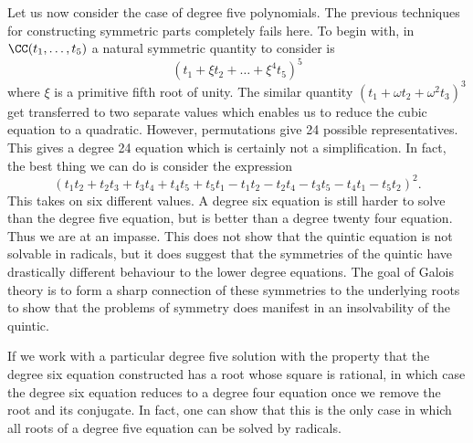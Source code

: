Let us now consider the case of degree five polynomials. The previous techniques for constructing symmetric parts completely fails here. To begin with, in $\CC(t_1,\dots,t_5)$ a natural symmetric quantity to consider is
%
\[ (t_1 + \xi t_2 + \dots + \xi^4 t_5)^5 \]
%
where $\xi$ is a primitive fifth root of unity. The similar quantity $(t_1 + \omega t_2 + \omega^2 t_3)^3$ get transferred to two separate values which enables us to reduce the cubic equation to a quadratic. However, permutations give 24 possible representatives. This gives a degree 24 equation which is certainly not a simplification. In fact, the best thing we can do is consider the expression
%
\[ (t_1t_2 + t_2t_3 + t_3t_4 + t_4t_5 + t_5t_1 - t_1t_2 - t_2t_4 - t_3t_5 - t_4t_1 - t_5t_2)^2. \]
%
This takes on six different values. A degree six equation is still harder to solve than the degree five equation, but is better than a degree twenty four equation. Thus we are at an impasse. This does not show that the quintic equation is not solvable in radicals, but it does suggest that the symmetries of the quintic have drastically different behaviour to the lower degree equations. The goal of Galois theory is to form a sharp connection of these symmetries to the underlying roots to show that the problems of symmetry does manifest in an insolvability of the quintic.

\begin{remark}
	If we work with a particular degree five solution with the property that the degree six equation constructed has a root whose square is rational, in which case the degree six equation reduces to a degree four equation once we remove the root and its conjugate. In fact, one can show that this is the only case in which all roots of a degree five equation can be solved by radicals.
\end{remark}

%
%
%
%

